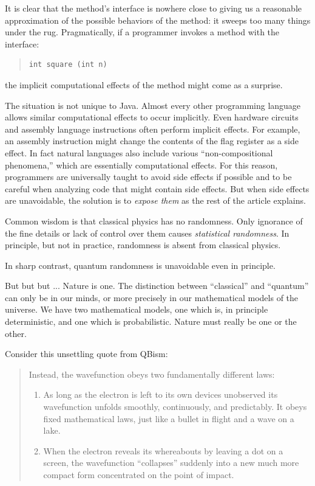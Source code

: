 \documentclass{article}
\theoremstyle{remark}
\begin{document}
It is clear that the method's interface is nowhere close to giving us a
reasonable approximation of the possible behaviors of the method: it sweeps
too many things under the rug. Pragmatically, if a programmer invokes a
method with the interface:
\begin{quote}
\begin{verbatim} 
int square (int n)
\end{verbatim}
\end{quote}
the implicit computational effects of the method might come as a
surprise. 

The situation is not unique to Java. Almost every other programming
language allows similar computational effects to occur
implicitly. Even hardware circuits and assembly language instructions
often perform implicit effects. For example, an assembly instruction
might change the contents of the flag register as a side effect. In
fact natural languages also include various ``non-compositional
phenomena,'' which are essentially computational effects. For this
reason, programmers are universally taught to avoid side effects if
possible and to be careful when analyzing code that might contain side
effects. But when side effects are unavoidable, the solution is to
\emph{expose them} as the rest of the article explains.

Common wisdom is that classical physics has no randomness. Only
ignorance of the fine details or lack of control over them causes
\emph{statistical randomness}. In principle, but not in practice,
randomness is absent from classical physics.

In sharp contrast, quantum randomness is unavoidable even in principle. 

But but but ... Nature is one. The distinction between ``classical''
and ``quantum'' can only be in our minds, or more precisely in our
mathematical models of the universe. We have two mathematical models,
one which is, in principle deterministic, and one which is
probabilistic. Nature must really be one or the other.

Consider this unsettling quote from QBism:

\begin{quote} 
Instead, the wavefunction obeys two fundamentally different laws:
\begin{enumerate}
\item As long as the electron is left to its own devices unobserved
  its wavefunction unfolds smoothly, continuously, and predictably. It
  obeys fixed mathematical laws, just like a bullet in flight and a
  wave on a lake.
\item When the electron reveals its whereabouts by leaving a dot on a
  screen, the wavefunction ``collapses'' suddenly into a new much more
  compact form concentrated on the point of impact.
\end{enumerate}

\end{quote}
\end{document}
